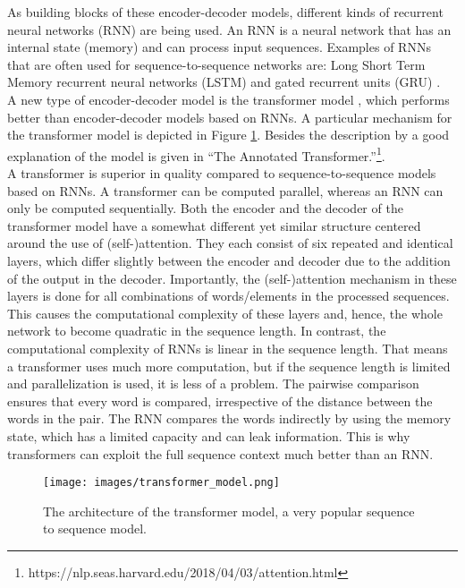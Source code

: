   As building blocks of these encoder-decoder models, different kinds of recurrent neural networks (RNN) \citep{rnn} are being used. An RNN is a neural network that has an internal state (memory) and can process input sequences. Examples of RNNs that are often used for sequence-to-sequence networks are: Long Short Term Memory recurrent neural networks (LSTM) \citep{lstm} and gated recurrent units (GRU) \citep{gru}.\\


A new type of encoder-decoder model is the transformer model \citep{vaswani2017attention}, which performs better than encoder-decoder models based on RNNs. A particular mechanism for the transformer model is depicted in Figure \ref{imgtransformer}. Besides the description by \citep{vaswani2017attention} a good explanation of the model is given in “The Annotated Transformer.”\footnote{https://nlp.seas.harvard.edu/2018/04/03/attention.html}. \\

A transformer is superior in quality compared to sequence-to-sequence models based on RNNs. A transformer can be computed parallel, whereas an RNN can only be computed sequentially. Both the encoder and the decoder of the transformer model have a somewhat different yet similar structure centered around the use of (self-)attention. They each consist of six repeated and identical layers, which differ slightly between the encoder and decoder due to the addition of the output in the decoder. Importantly, the (self-)attention mechanism in these layers is done for all combinations of words/elements in the processed sequences.  This causes the computational complexity of these layers and, hence, the whole network to become 
quadratic in the sequence length. In contrast, the computational complexity of RNNs is linear in the sequence length. That means a transformer uses much more computation, but if the sequence length is limited and parallelization is used, it is less of a problem. The pairwise comparison ensures that every word is compared, irrespective of the distance between the words in the pair.  The RNN compares the words indirectly by using the memory state, which has a limited capacity and can leak information. This is why transformers can exploit the full sequence context much better than an RNN.

\begin{figure}[h]
\centering
\captionsetup{justification=centering}
\texttt{[image: images/transformer\_model.png]}
\caption{The architecture of the transformer model, a very popular sequence to sequence model.}
\label{imgtransformer}
\end{figure}


